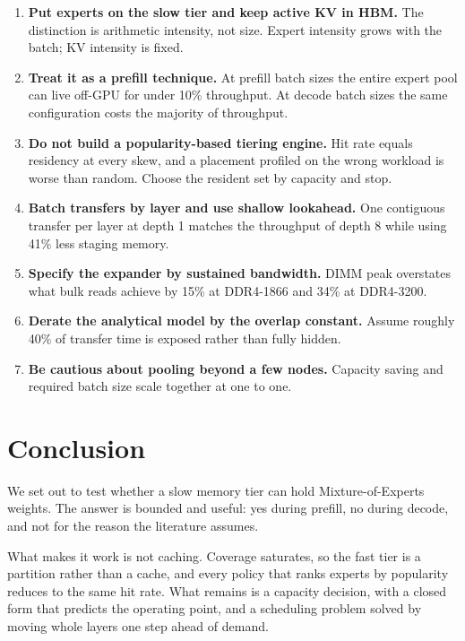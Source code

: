 \documentclass[10pt,a4paper]{article}
\begin{document}
\begin{enumerate}[leftmargin=*]
\item \textbf{Put experts on the slow tier and keep active KV in HBM.} The
distinction is arithmetic intensity, not size. Expert intensity grows with the
batch; KV intensity is fixed.

\item \textbf{Treat it as a prefill technique.} At prefill batch sizes the entire
expert pool can live off-GPU for under 10\% throughput. At decode batch sizes the
same configuration costs the majority of throughput.

\item \textbf{Do not build a popularity-based tiering engine.} Hit rate equals
residency at every skew, and a placement profiled on the wrong workload is worse
than random. Choose the resident set by capacity and stop.

\item \textbf{Batch transfers by layer and use shallow lookahead.} One contiguous
transfer per layer at depth 1 matches the throughput of depth 8 while using 41\%
less staging memory.

\item \textbf{Specify the expander by sustained bandwidth.} DIMM peak overstates
what bulk reads achieve by 15\% at DDR4-1866 and 34\% at DDR4-3200.

\item \textbf{Derate the analytical model by the overlap constant.} Assume roughly
40\% of transfer time is exposed rather than fully hidden.

\item \textbf{Be cautious about pooling beyond a few nodes.} Capacity saving and
required batch size scale together at one to one.
\end{enumerate}

\section{Conclusion}

We set out to test whether a slow memory tier can hold Mixture-of-Experts weights.
The answer is bounded and useful: yes during prefill, no during decode, and not
for the reason the literature assumes.

What makes it work is not caching. Coverage saturates, so the fast
tier is a partition rather than a cache, and every policy that ranks experts by
popularity reduces to the same hit rate. What remains is a capacity decision, with
a closed form that predicts the operating point, and a scheduling problem solved
by moving whole layers one step ahead of demand.
\end{document}
